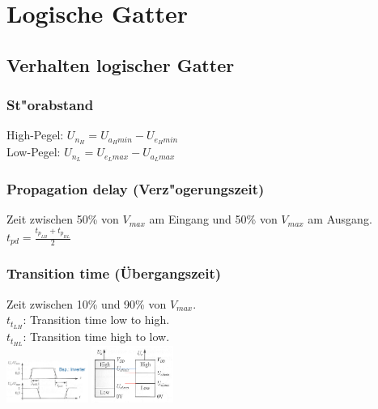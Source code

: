 \section{Logische Gatter}

	\subsection{Verhalten logischer Gatter}
		\begin{multicols}{2}
			\subsubsection{St"orabstand}
				High-Pegel: $ U_{n_H} = U_{a_Hmin} - U_{e_Hmin} $\\
				Low-Pegel: $ U_{n_L} = U_{e_Lmax} - U_{a_Lmax} $\\
				

			\subsubsection{Propagation delay (Verz"ogerungszeit) }
				Zeit zwischen 50\% von $V_{max}$ am Eingang und 50\% von $V_{max}$ am Ausgang.\\
				$t_{pd}=\frac{t_{p_{LH}}+t_{p_{HL}}}{2}$\\
				
			\subsubsection{Transition time (Übergangszeit)}
				Zeit zwischen 10\% und 90\% von $V_{max}$.\\
				$t_{t_{LH}}$: Transition time low to high.\\
				$t_{t_{HL}}$: Transition time high to low.\\
				\includegraphics[width=0.2\textwidth]{pics/delay}
				\includegraphics[width=0.2\textwidth]{pics/Pegelbereiche_Stoerabstand}
		\end{multicols}

